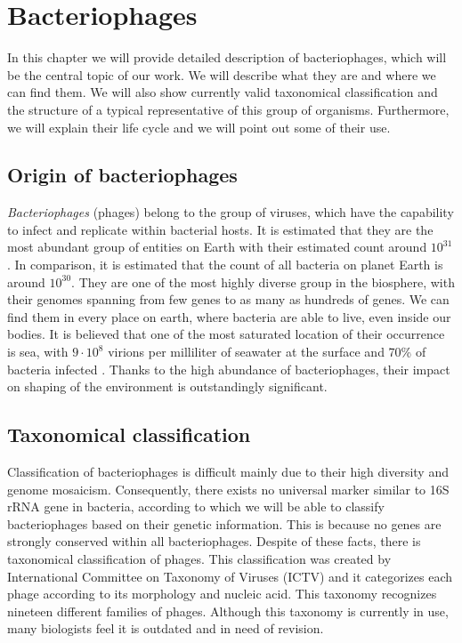 \chapter{Bacteriophages}
In this chapter we will provide detailed description of bacteriophages, which will be the central topic of our work.
We will describe what they are and where we can find them.
We will also show currently valid taxonomical classification and the structure of a typical representative of this group of organisms.
Furthermore, we will explain their life cycle and we will point out some of their use.

\section{Origin of bacteriophages}
\emph{Bacteriophages} (phages) belong to the group of viruses, which have the capability to infect and replicate within bacterial hosts.
It is estimated that they are the most abundant group of entities on Earth with their estimated count around $10^{31}$\cite{phage}.
In comparison, it is estimated that the count of all bacteria on planet Earth is around $10^{30}$.
They are one of the most highly diverse group in the biosphere, with their genomes spanning from few genes to as many as hundreds of genes.
We can find them in every place on earth, where bacteria are able to live, even inside our bodies.
It is believed that one of the most saturated location of their occurrence is sea, with  $9\cdot 10^8$ virions per milliliter of seawater at the surface and 70\% of bacteria infected \cite{virioplankton}.
Thanks to the high abundance of bacteriophages, their impact on shaping of the environment is outstandingly significant.

\section{Taxonomical classification}
Classification of bacteriophages is difficult mainly due to their high diversity and genome mosaicism. \cite{phagetax}
Consequently, there exists no universal marker similar to 16S rRNA gene in bacteria, according to which we will be able to classify bacteriophages based on their genetic information.
This is because no genes are strongly conserved within all bacteriophages.
Despite of these facts, there is taxonomical classification of phages.
This classification was created by International Committee on Taxonomy of Viruses (ICTV) and it categorizes each phage according to its morphology and nucleic acid.
This taxonomy recognizes nineteen different families of phages.
Although this taxonomy is currently in use, many biologists feel it is outdated and in need of revision. \cite{phagetax}


